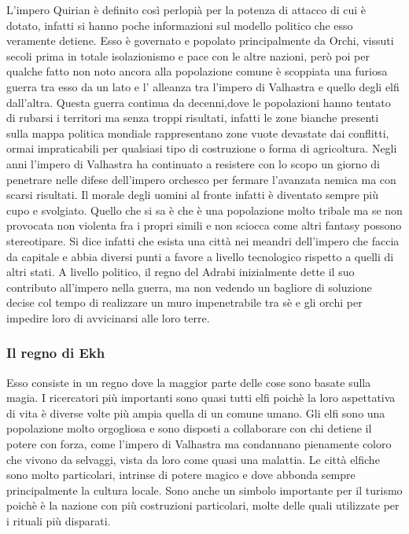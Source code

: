 \documentclass[a4paper,12pt]{book}
\begin{document}
L'impero Quirian è definito così perlopià per la potenza di attacco di cui è dotato, infatti si hanno poche informazioni sul modello politico che esso veramente detiene.
Esso è governato e popolato principalmente da Orchi, vissuti secoli prima in totale isolazionismo e pace con le altre nazioni, però poi per qualche fatto non noto ancora alla popolazione comune è scoppiata una furiosa guerra tra esso da un lato e l' alleanza tra l'impero di Valhastra e quello degli elfi dall'altra.
Questa guerra continua da decenni,dove le popolazioni hanno tentato di rubarsi i territori ma senza troppi risultati, infatti le zone bianche presenti sulla mappa politica mondiale rappresentano zone vuote devastate dai conflitti, ormai impraticabili per qualsiasi tipo di costruzione o forma di agricoltura.
Negli anni l'impero di Valhastra ha continuato a resistere con lo scopo un giorno di penetrare nelle difese dell'impero orchesco per fermare l'avanzata nemica ma con scarsi risultati.
Il morale degli uomini al fronte infatti è diventato sempre più cupo e svolgiato.
Quello che si sa è che è una popolazione molto tribale ma se non provocata non violenta fra i propri simili e non sciocca come altri fantasy possono stereotipare. Si dice infatti che esista una città nei meandri dell'impero che faccia da capitale e abbia diversi punti a favore a livello tecnologico rispetto a quelli di altri stati.
A livello politico, il regno del Adrabi inizialmente dette il suo contributo all'impero nella guerra, ma non vedendo un bagliore di soluzione decise col tempo di realizzare un muro impenetrabile tra sè e gli orchi per impedire loro di avvicinarsi alle loro terre.

\subsubsection{Il regno di Ekh}

Esso consiste in un regno dove la maggior parte delle cose sono basate sulla magia.
I ricercatori più importanti sono quasi tutti elfi poichè la loro aspettativa di vita è diverse volte più ampia quella di un comune umano.
Gli elfi sono una popolazione molto orgogliosa e sono disposti a collaborare con chi detiene il potere con forza, come l'impero di Valhastra ma condannano pienamente coloro che vivono da selvaggi, vista da loro come quasi una malattia.
Le città elfiche sono molto particolari, intrinse di potere magico e dove abbonda sempre principalmente la cultura locale.
Sono anche un simbolo importante per il turismo poichè è la nazione con più costruzioni particolari, molte delle quali utilizzate per i rituali più disparati.
\end{document}
